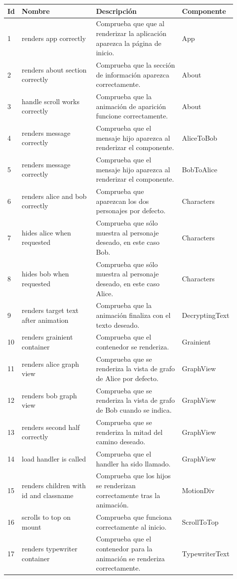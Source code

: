 \begin{longtable}{|p{0.02\linewidth}|p{0.35\linewidth}|p{0.4\linewidth}|p{0.15\linewidth}|}

    \hline \textbf{Id} & \textbf{Nombre} & \textbf{Descripción} & \textbf{Componente} \\ \hline \endhead
    
    1 & renders app correctly & Comprueba que que al renderizar la aplicación aparezca la página de inicio. & App \\ \hline

    2 & renders about section correctly & Comprueba que la sección de información aparezca correctamente. & About \\ \hline
    3 & handle scroll works correctly & Comprueba que la animación de aparición funcione correctamente. & About \\ \hline
    
    4 & renders message correctly & Comprueba que el mensaje hijo aparezca al renderizar el componente. & AliceToBob \\ \hline
    5 & renders message correctly & Comprueba que el mensaje hijo aparezca al renderizar el componente. & BobToAlice \\ \hline
    6 & renders alice and bob correctly & Comprueba que aparezcan los dos personajes por defecto. & Characters \\ \hline
    7 & hides alice when requested & Comprueba que sólo muestra al personaje deseado, en este caso Bob. & Characters \\ \hline
    8 & hides bob when requested & Comprueba que sólo muestra al personaje deseado, en este caso Alice. & Characters \\ \hline
    9 & renders target text after animation & Comprueba que la animación finaliza con el texto deseado. & DecryptingText \\ \hline
    10 & renders grainient container & Comprueba que el contenedor se renderiza. & Grainient \\ \hline
    11 & renders alice graph view & Comprueba que se renderiza la vista de grafo de Alice por defecto. & GraphView \\ \hline
    12 & renders bob graph view & Comprueba que se renderiza la vista de grafo de Bob cuando se indica. & GraphView \\ \hline
    13 & renders second half correctly & Comprueba que se renderiza la mitad del camino deseado. & GraphView \\ \hline
    14 & load handler is called & Comprueba que el handler ha sido llamado. & GraphView \\ \hline
    15 & renders children with id and classname & Comprueba que los hijos se renderizan correctamente tras la animación. & MotionDiv \\ \hline
    16 & scrolls to top on mount & Comprueba que funciona correctamente al inicio. & ScrollToTop \\ \hline
    17 & renders typewriter container & Comprueba que el contenedor para la animación se renderiza correctamente. & TypewriterText \\ \hline


\end{longtable}
